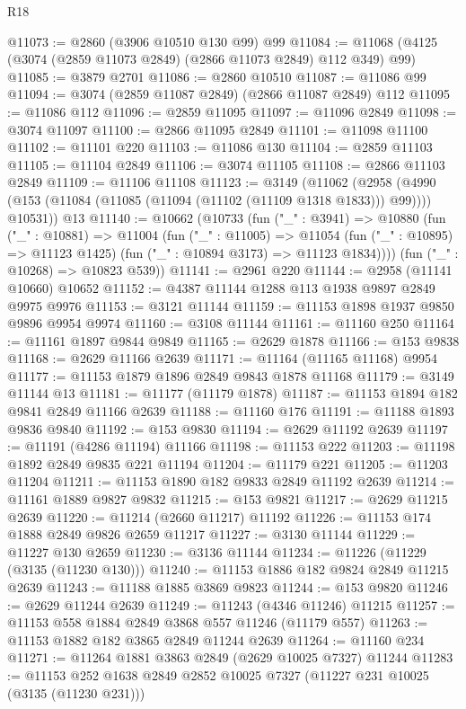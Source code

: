 \begin{lexlean}{R18}
\begin{coremodule}
@11073 := @2860 (@3906 @10510 @130 @99) @99
@11084 := @11068 (@4125 (@3074 (@2859 @11073 @2849) (@2866 @11073 @2849) @112 @349) @99)
@11085 := @3879 @2701
@11086 := @2860 @10510
@11087 := @11086 @99
@11094 := @3074 (@2859 @11087 @2849) (@2866 @11087 @2849) @112
@11095 := @11086 @112
@11096 := @2859 @11095
@11097 := @11096 @2849
@11098 := @3074 @11097
@11100 := @2866 @11095 @2849
@11101 := @11098 @11100
@11102 := @11101 @220
@11103 := @11086 @130
@11104 := @2859 @11103
@11105 := @11104 @2849
@11106 := @3074 @11105
@11108 := @2866 @11103 @2849
@11109 := @11106 @11108
@11123 := @3149
    (@11062
      (@2958 (@4990 (@153 (@11084 (@11085 (@11094 (@11102 (@11109 @1318 @1833))) @99)))) @10531))
    @13
@11140 := @10662
    (@10733
      (fun ("_" : @3941) =>
      @10880
        (fun ("_" : @10881) =>
        @11004
          (fun ("_" : @11005) =>
          @11054 (fun ("_" : @10895) => @11123 @1425) (fun ("_" : @10894 @3173) => @11123 @1834))))
      (fun ("_" : @10268) => @10823 @539))
@11141 := @2961 @220
@11144 := @2958 (@11141 @10660) @10652
@11152 := @4387 @11144 @1288 @113 @1938 @9897 @2849 @9975 @9976
@11153 := @3121 @11144
@11159 := @11153 @1898 @1937 @9850 @9896 @9954 @9974
@11160 := @3108 @11144
@11161 := @11160 @250
@11164 := @11161 @1897 @9844 @9849
@11165 := @2629 @1878
@11166 := @153 @9838
@11168 := @2629 @11166 @2639
@11171 := @11164 (@11165 @11168) @9954
@11177 := @11153 @1879 @1896 @2849 @9843 @1878 @11168
@11179 := @3149 @11144 @13
@11181 := @11177 (@11179 @1878)
@11187 := @11153 @1894 @182 @9841 @2849 @11166 @2639
@11188 := @11160 @176
@11191 := @11188 @1893 @9836 @9840
@11192 := @153 @9830
@11194 := @2629 @11192 @2639
@11197 := @11191 (@4286 @11194) @11166
@11198 := @11153 @222
@11203 := @11198 @1892 @2849 @9835 @221 @11194
@11204 := @11179 @221
@11205 := @11203 @11204
@11211 := @11153 @1890 @182 @9833 @2849 @11192 @2639
@11214 := @11161 @1889 @9827 @9832
@11215 := @153 @9821
@11217 := @2629 @11215 @2639
@11220 := @11214 (@2660 @11217) @11192
@11226 := @11153 @174 @1888 @2849 @9826 @2659 @11217
@11227 := @3130 @11144
@11229 := @11227 @130 @2659
@11230 := @3136 @11144
@11234 := @11226 (@11229 (@3135 (@11230 @130)))
@11240 := @11153 @1886 @182 @9824 @2849 @11215 @2639
@11243 := @11188 @1885 @3869 @9823
@11244 := @153 @9820
@11246 := @2629 @11244 @2639
@11249 := @11243 (@4346 @11246) @11215
@11257 := @11153 @558 @1884 @2849 @3868 @557 @11246 (@11179 @557)
@11263 := @11153 @1882 @182 @3865 @2849 @11244 @2639
@11264 := @11160 @234
@11271 := @11264 @1881 @3863 @2849 (@2629 @10025 @7327) @11244
@11283 := @11153 @252 @1638 @2849 @2852 @10025 @7327 (@11227 @231 @10025 (@3135 (@11230 @231)))

\end{coremodule}
\end{lexlean}
